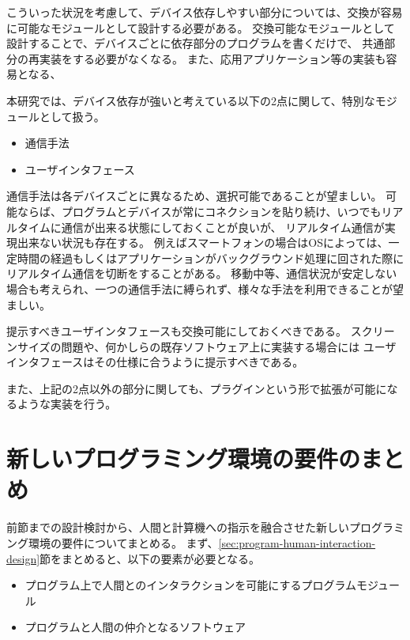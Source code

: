 こういった状況を考慮して、デバイス依存しやすい部分については、交換が容易に可能なモジュールとして設計する必要がある。
交換可能なモジュールとして設計することで、デバイスごとに依存部分のプログラムを書くだけで、
共通部分の再実装をする必要がなくなる。
また、応用アプリケーション等の実装も容易となる、

本研究では、デバイス依存が強いと考えている以下の2点に関して、特別なモジュールとして扱う。

\begin{itemize}
\itemsep1pt\parskip0pt
\item
  通信手法
\item
  ユーザインタフェース
\end{itemize}

通信手法は各デバイスごとに異なるため、選択可能であることが望ましい。
可能ならば、プログラムとデバイスが常にコネクションを貼り続け、いつでもリアルタイムに通信が出来る状態にしておくことが良いが、
リアルタイム通信が実現出来ない状況も存在する。
例えばスマートフォンの場合はOSによっては、一定時間の経過もしくはアプリケーションがバックグラウンド処理に回された際に
リアルタイム通信を切断をすることがある。
移動中等、通信状況が安定しない場合も考えられ、一つの通信手法に縛られず、様々な手法を利用できることが望ましい。

提示すべきユーザインタフェースも交換可能にしておくべきである。
スクリーンサイズの問題や、何かしらの既存ソフトウェア上に実装する場合には
ユーザインタフェースはその仕様に合うように提示すべきである。

また、上記の2点以外の部分に関しても、プラグインという形で拡張が可能になるような実装を行う。

\section{新しいプログラミング環境の要件のまとめ}\label{ux65b0ux3057ux3044ux30d7ux30edux30b0ux30e9ux30dfux30f3ux30b0ux74b0ux5883ux306eux8981ux4ef6ux306eux307eux3068ux3081}

前節までの設計検討から、人間と計算機への指示を融合させた新しいプログラミング環境の要件についてまとめる。
まず、\ref{sec:program-human-interaction-design}節をまとめると、以下の要素が必要となる。

\begin{itemize}
\itemsep1pt\parskip0pt
\item
  プログラム上で人間とのインタラクションを可能にするプログラムモジュール
\item
  プログラムと人間の仲介となるソフトウェア
\end{itemize}

